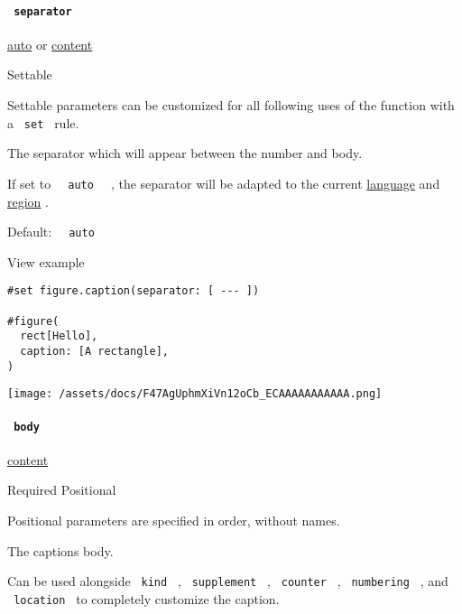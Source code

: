 \paragraph{\texorpdfstring{\texttt{\ separator\ }}{ separator }}\label{definitions-caption-separator}

\href{/docs/reference/foundations/auto/}{auto} {or}
\href{/docs/reference/foundations/content/}{content}

{{ Settable }}

\label{definitions-caption-separator-settable-tooltip}
Settable parameters can be customized for all following uses of the
function with a \texttt{\ set\ } rule.

The separator which will appear between the number and body.

If set to \texttt{\ }{\texttt{\ auto\ }}\texttt{\ } , the separator will
be adapted to the current
\href{/docs/reference/text/text/\#parameters-lang}{language} and
\href{/docs/reference/text/text/\#parameters-region}{region} .

Default: \texttt{\ }{\texttt{\ auto\ }}\texttt{\ }


View example

\begin{verbatim}
#set figure.caption(separator: [ --- ])

#figure(
  rect[Hello],
  caption: [A rectangle],
)
\end{verbatim}

\texttt{[image: /assets/docs/F47AgUphmXiVn12oCb\_ECAAAAAAAAAAA.png]}

\paragraph{\texorpdfstring{\texttt{\ body\ }}{ body }}\label{definitions-caption-body}

\href{/docs/reference/foundations/content/}{content}

{Required} {{ Positional }}

\label{definitions-caption-body-positional-tooltip}
Positional parameters are specified in order, without names.

The caption\textquotesingle s body.

Can be used alongside \texttt{\ kind\ } , \texttt{\ supplement\ } ,
\texttt{\ counter\ } , \texttt{\ numbering\ } , and
\texttt{\ location\ } to completely customize the caption.

